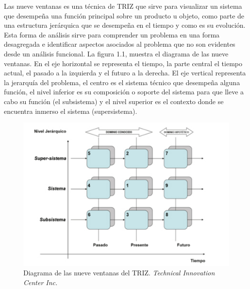 Las nueve ventanas es una t\'ecnica de TRIZ que sirve para visualizar un sistema que desempe\~{n}a una funci\'on principal sobre un producto u objeto, como parte de una estructura jer\'arquica que se desempe\~{n}a en el tiempo y como es su evoluci\'on. Esta forma de an\'alisis sirve para comprender un problema en una forma desagregada e identificar aspectos asociados al problema que no son evidentes desde un an\'alisis funcional. La figura 1.1, muestra el diagrama de las nueve ventanas. En el eje horizontal se representa el tiempo, la parte central el tiempo actual, el pasado a la izquierda y el futuro a la derecha. El eje vertical representa la jerarqu\'ia del problema, el centro es el sistema t\'ecnico que desempe\~{n}a alguna funci\'on, el nivel inferior es su composici\'on o soporte del sistema para que lleve a cabo su funci\'on (el subsistema) y el nivel superior es el contexto donde se encuentra inmerso el sistema (supersistema).\cite{25}

\begin{figure}[ht]
\centering
\includegraphics[scale=0.73]{TRIZ.png}
\caption{Diagrama de las nueve ventanas del TRIZ. \textit{Technical Innovation Center Inc.}}
\label{1}
\end{figure}
\FloatBarrier

